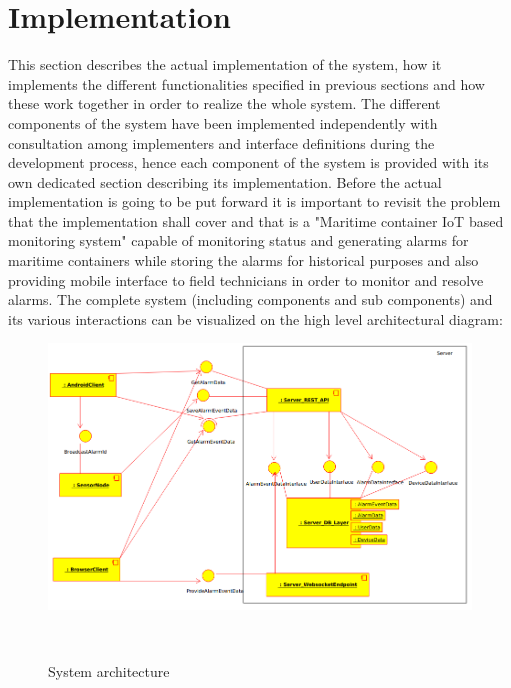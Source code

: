 \chapter{Implementation}
\label{cha:implementation}

This section describes the actual implementation of the system, how it implements the different functionalities specified in previous sections and how these work together in order to realize the whole system. The different components of the system have been implemented independently with consultation among implementers and interface definitions during the development process, hence each component of the system is provided with its own dedicated section describing its implementation. Before the actual implementation is going to be put forward it is important to revisit the problem that the implementation shall cover and that is a "Maritime container IoT based monitoring system" capable of monitoring status and generating alarms for maritime containers while storing the alarms for historical purposes and also providing mobile interface to field technicians in order to monitor and resolve alarms. The complete system (including components and sub components) and its various interactions can be visualized on the high level architectural diagram:


\begin{figure}[H]
\centering
\includegraphics[scale=0.47]{gfx/Architecture}
\caption{System architecture}~\label{fig:servercomm}
\end{figure}








